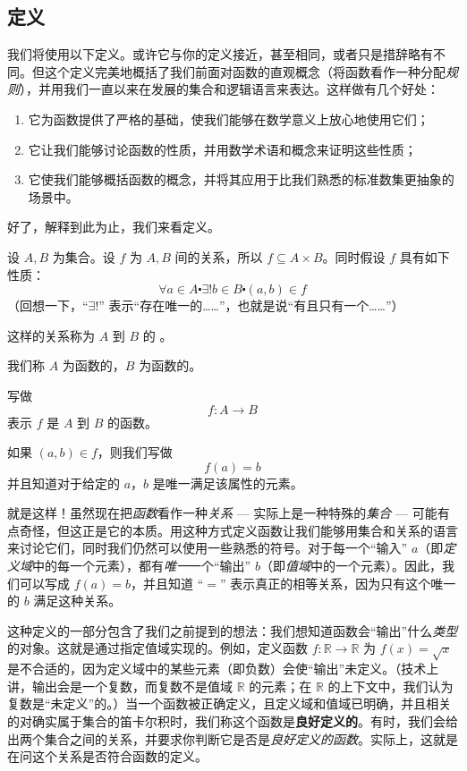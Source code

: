 
\subsection{定义}

我们将使用以下定义。或许它与你的定义接近，甚至相同，或者只是措辞略有不同。但这个定义完美地概括了我们前面对函数的直观概念（将函数看作一种分配\emph{规则}），并用我们一直以来在发展的集合和逻辑语言来表达。这样做有几个好处：

\begin{enumerate}[label=(\alph*)]
    \item 它为函数提供了严格的基础，使我们能够在数学意义上放心地使用它们；
    \item 它让我们能够讨论函数的性质，并用数学术语和概念来证明这些性质；
    \item 它使我们能够概括函数的概念，并将其应用于比我们熟悉的标准数集更抽象的场景中。
\end{enumerate}
好了，解释到此为止，我们来看定义。\\

\begin{definition}
    设 $A, B$ 为集合。设 $f$ 为 $A, B$ 间的关系，所以 $f \subseteq A \times B$。同时假设 $f$ 具有如下性质：
    \[\forall a \in A \centerdot \exists! b \in B \centerdot (a, b) \in f\]
    （回想一下，``$\exists!$'' 表示``存在唯一的……''，也就是说``有且只有一个……''）

    这样的关系称为 $A$ 到 $B$ 的 。

    我们称 $A$ 为函数的，$B$ 为函数的。

    写做
    \[f:A \to B\]
    表示 $f$ 是 $A$ 到 $B$ 的函数。

    如果 $(a,b) \in f$，则我们写做
    \[f(a) = b\]
    并且知道对于给定的 $a$，$b$ 是唯一满足该属性的元素。
\end{definition}

就是这样！虽然现在把\emph{函数}看作一种\emph{关系} --- 实际上是一种特殊的\emph{集合} --- 可能有点奇怪，但这正是它的本质。用这种方式定义函数让我们能够用集合和关系的语言来讨论它们，同时我们仍然可以使用一些熟悉的符号。对于每一个``输入'' $a$（即\emph{定义域}中的每一个元素），都有\emph{唯一}一个``输出'' $b$（即\emph{值域}中的一个元素）。因此，我们可以写成 $f(a) = b$，并且知道 ``$=$'' 表示真正的相等关系，因为只有这个唯一的 $b$ 满足这种关系。

这种定义的一部分包含了我们之前提到的想法：我们想知道函数会``输出''什么\emph{类型}的对象。这就是通过指定值域实现的。例如，定义函数 $f : \mathbb{R} \to \mathbb{R}$ 为 $f(x) = \sqrt{x}$ 是不合适的，因为定义域中的某些元素（即负数）会使``输出''未定义。（技术上讲，输出会是一个复数，而复数不是值域 $\mathbb{R}$ 的元素；在 $\mathbb{R}$ 的上下文中，我们认为复数是``未定义''的。）当一个函数被正确定义，且定义域和值域已明确，并且相关的对确实属于集合的笛卡尔积时，我们称这个函数是\textbf{良好定义的}。有时，我们会给出两个集合之间的关系，并要求你判断它是否是\emph{良好定义的函数}。实际上，这就是在问这个关系是否符合函数的定义。


